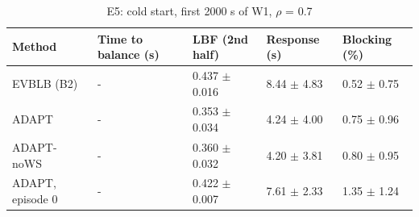 \begin{table}[t]
\centering
\footnotesize
\caption{E5: cold start, first 2000 s of W1, $\rho$ = 0.7}
\label{tab:e5}
\begin{tabular}{lllll}
\toprule
Method & Time to balance (s) & LBF (2nd half) & Response (s) & Blocking (\%) \\
\midrule
EVBLB (B2) & - & 0.437 $\pm$ 0.016 & 8.44 $\pm$ 4.83 & 0.52 $\pm$ 0.75 \\
ADAPT & - & 0.353 $\pm$ 0.034 & 4.24 $\pm$ 4.00 & 0.75 $\pm$ 0.96 \\
ADAPT-noWS & - & 0.360 $\pm$ 0.032 & 4.20 $\pm$ 3.81 & 0.80 $\pm$ 0.95 \\
ADAPT, episode 0 & - & 0.422 $\pm$ 0.007 & 7.61 $\pm$ 2.33 & 1.35 $\pm$ 1.24 \\
\bottomrule
\end{tabular}
\end{table}
